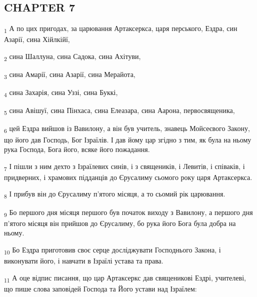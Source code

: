 \subsection{CHAPTER 7}
\begin{tcolorbox}
\textsubscript{1} А по цих пригодах, за царювання Артаксеркса, царя перського, Ездра, син Азарії, сина Хійлкійї,
\end{tcolorbox}
\begin{tcolorbox}
\textsubscript{2} сина Шаллуна, сина Садока, сина Ахітуви,
\end{tcolorbox}
\begin{tcolorbox}
\textsubscript{3} сина Амарії, сина Азарії, сина Мерайота,
\end{tcolorbox}
\begin{tcolorbox}
\textsubscript{4} сина Захарія, сина Уззі, сина Буккі,
\end{tcolorbox}
\begin{tcolorbox}
\textsubscript{5} сина Авішуї, сина Пінхаса, сина Елеазара, сина Аарона, первосвященика,
\end{tcolorbox}
\begin{tcolorbox}
\textsubscript{6} цей Ездра вийшов із Вавилону, а він був учитель, знавець Мойсеєвого Закону, що його дав Господь, Бог Ізраїлів. І дав йому цар згідно з тим, як була на ньому рука Господа, Бога його, всяке його пожадання.
\end{tcolorbox}
\begin{tcolorbox}
\textsubscript{7} І пішли з ним дехто з Ізраїлевих синів, і з священиків, і Левитів, і співаків, і придверних, і храмових підданців до Єрусалиму сьомого року царя Артаксеркса.
\end{tcolorbox}
\begin{tcolorbox}
\textsubscript{8} І прибув він до Єрусалиму п'ятого місяця, а то сьомий рік царювання.
\end{tcolorbox}
\begin{tcolorbox}
\textsubscript{9} Бо першого дня місяця першого був початок виходу з Вавилону, а першого дня п'ятого місяця він прийшов до Єрусалиму, бо рука його Бога була добра на ньому.
\end{tcolorbox}
\begin{tcolorbox}
\textsubscript{10} Бо Ездра приготовив своє серце досліджувати Господнього Закона, і виконувати його, і навчати в Ізраїлі устава та права.
\end{tcolorbox}
\begin{tcolorbox}
\textsubscript{11} А оце відпис писання, що цар Артаксеркс дав священикові Ездрі, учителеві, що пише слова заповідей Господа та Його устави над Ізраїлем:
\end{tcolorbox}
